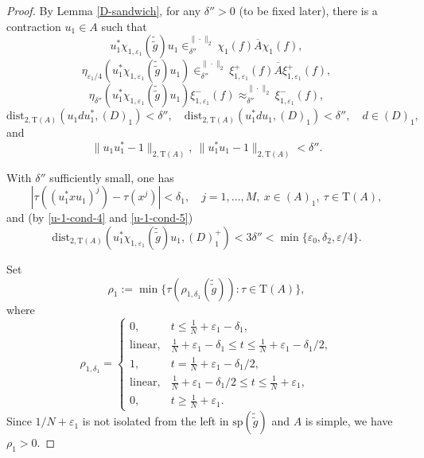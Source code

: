 \documentclass[12pt, oneside, psamsfonts]{amsart}
\theoremstyle{definition}
\theoremstyle{remark}
\numberwithin{equation}{section}
\newcommand{\norm}[1]{\| #1\|}
\newcommand{\abs}[1]{| #1 |}
\newcommand{\eps}{\varepsilon}
\newcommand{\tr}{\mathrm{T}}
\begin{document}
\begin{proof}
By Lemma \ref{D-sandwich}, for any $\delta''>0$ (to be fixed later), there is a contraction $u_1 \in A$ such that
\begin{equation}\label{u-1-cond-1}
 u_1^*\chi_{1, \eps_1}(\tilde{\tilde{g}})u_1 \in^{\norm{\cdot}_2}_{\delta''}   \overline{\chi_1(f)A\chi_1(f)},
 \end{equation}
\begin{equation}\label{u-1-cond-2}
\eta_{\eps_1/4}(u^*_1 \chi_{1, \eps_1}(\tilde{\tilde{g}}) u_1) \in^{\norm{\cdot}_2}_{\delta''} \overline{\xi_{1, \eps_1}^+(f) A \xi_{1, \eps_1}^+(f)},
\end{equation}
%
\begin{equation}\label{u-1-cond-3}
 \eta_{\delta''}(u_1^*\chi_{1, \eps_1}(\tilde{\tilde{g}})u_1) \xi_{1, \eps_1}^-(f)  \approx_{\delta''}^{\norm{\cdot}_2} \xi_{1, \eps_1}^-(f),
 \end{equation}
\begin{equation}\label{u-1-cond-4}
\mathrm{dist}_{2, \tr(A)}(u_1du_1^*, (D)_1) < \delta'',\quad \mathrm{dist}_{2, \tr(A)}(u_1^*du_1, (D)_1) < \delta'',\quad d \in (D)_1,
\end{equation}
and
\begin{equation}\label{u-1-cond-5}
\norm{u_1u_1^* - 1}_{2, \tr(A)},\  \norm{u_1^*u_1 - 1}_{2, \tr(A)} < \delta''.
\end{equation}

With $\delta''$ sufficiently small, one has  
\begin{equation}\label{u-1-match-tr-p}
\abs{\tau((u_1^* x u_1)^j) - \tau(x^j)} < \delta_1,\quad j=1, ..., M,\  x\in (A)_1,\ \tau \in \tr(A),
\end{equation}
and (by \eqref{u-1-cond-4} and \eqref{u-1-cond-5})
\begin{equation}\label{u-1-close-D}
\mathrm{dist}_{2, \tr(A)}(u_1^*\chi_{1, \eps_1}(\tilde{\tilde{g}}) u_1, (D)^+_1) < 3\delta''< \min\{\eps_0, \delta_2, \eps/4\}.
\end{equation}

Set 
$$ \rho_1:=\min\{\tau(\rho_{1, \delta_1}(\tilde{\tilde{g}})): \tau \in \tr(A)\},$$
where
$$\rho_{1, \delta_1} = \left\{
\begin{array}{ll}
0, & t\leq \frac{1}{N}+\eps_1-\delta_1, \\
\mathrm{linear}, & \frac{1}{N} + \eps_1-\delta_1 \leq t \leq \frac{1}{N} + \eps_1-\delta_1/2, \\
1, & t = \frac{1}{N} + \eps_1-\delta_1/2, \\
\mathrm{linear}, & \frac{1}{N} + \eps_1-\delta_1/2 \leq t \leq \frac{1}{N} + \eps_1, \\
0, & t \geq \frac{1}{N}+\eps_1.
\end{array}
\right. 
$$
Since $1/N + \eps_1$ is not isolated from the left in $\mathrm{sp}(\tilde{\tilde{g}})$ and $A$ is simple, we have $\rho_1>0$.


\end{proof}
\end{document}
